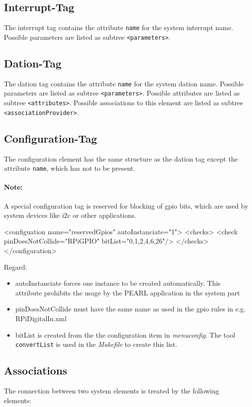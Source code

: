 \subsection{Interrupt-Tag}
The interrupt tag contains the attribute \verb|name| for the
system interrupt name.
Possible parameters are listed as subtree \verb|<parameters>|.

\subsection{Dation-Tag}
The dation tag contains the attribute \verb|name| for the
system dation name.
Possible parameters are listed as subtree \verb|<parameters>|.
Possible attributes are listed as subtree \verb|<attributes>|.
Possible associations to this element are
 listed as subtree \verb|<associationProvider>|.


\subsection{Configuration-Tag}
The configuration element has the same structure as the dation tag
except the attribute \verb|name|, which has not to be present.

\paragraph{Note:} A special configuration tag is reserved for
blocking of gpio bits, which are used by system devices like i2c or 
other applications.
\begin{XMLCode}
<configuation name="reservedGpios" autoInstanciate="1">
  <checks>
    <check pinDoesNotCollide="RPiGPIO" bitList="0,1,2,4,6,26"/>
  </checks>
</configuration>
\end{XMLCode}
Regard:
\begin{itemize}
\item autoInstanciate forces one instance to be created automatically.
  This attribute prohibits the usage by the PEARL application in the system part
\item pinDoesNotCollide must have  the same name as used in the gpio rules in 
   e.g. RPiDigitalIn.xml
\item bitList is created from the the configuration item in \textit{menuconfig}.
The tool \texttt{convertList} is used in the \textit{Makefile} to create this list.
\end{itemize}

\subsection{Associations}
The connection between two system elements is treated by the following
elements:

